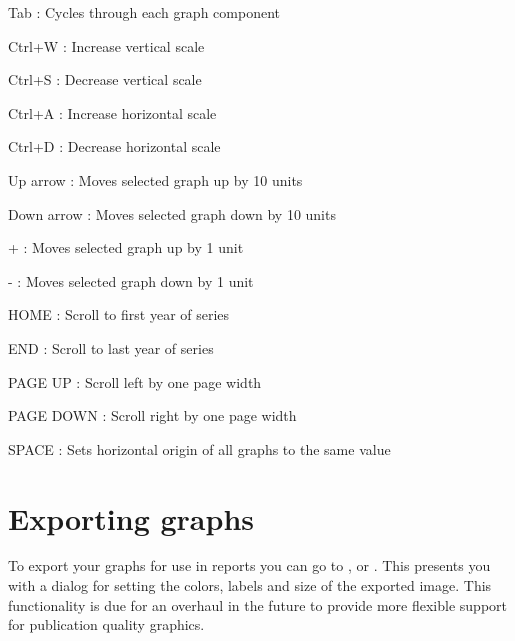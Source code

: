 \begin{description*}
 \item[Tab] : Cycles through each graph component
 \item[Ctrl+W] : Increase vertical scale
 \item[Ctrl+S] : Decrease vertical scale
 \item[Ctrl+A] : Increase horizontal scale
 \item[Ctrl+D] : Decrease horizontal scale
 \item[Up arrow] : Moves selected graph up by 10 units
 \item[Down arrow] : Moves selected graph down by 10 units
 \item[+] : Moves selected graph up by 1 unit
 \item[-] : Moves selected graph down by 1 unit
 \item[HOME] : Scroll to first year of series
 \item[END] : Scroll to last year of series
 \item[PAGE UP] : Scroll left by one page width
 \item[PAGE DOWN] : Scroll right by one page width
 \item[SPACE] : Sets horizontal origin of all graphs to the same value 
\end{description*}

\section{Exporting graphs}

To export your graphs for use in reports you can go to , or .  This presents you with a dialog for setting the colors, labels and size of the exported image.  This functionality is due for an overhaul in the future to provide more flexible support for publication quality graphics.  
